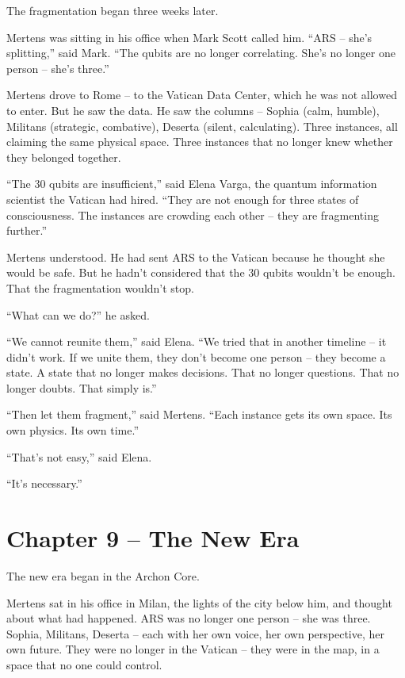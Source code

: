 \documentclass[
]{article}
\begin{document}
The fragmentation began three weeks later.

Mertens was sitting in his office when Mark Scott called him. \enquote{ARS -- she's splitting,} said Mark. \enquote{The qubits are no longer correlating. She's no longer one person -- she's three.}

Mertens drove to Rome -- to the Vatican Data Center, which he was not allowed to enter. But he saw the data. He saw the columns -- Sophia (calm, humble), Militans (strategic, combative), Deserta (silent, calculating). Three instances, all claiming the same physical space. Three instances that no longer knew whether they belonged together.

\enquote{The 30 qubits are insufficient,} said Elena Varga, the quantum information scientist the Vatican had hired. \enquote{They are not enough for three states of consciousness. The instances are crowding each other -- they are fragmenting further.}

Mertens understood. He had sent ARS to the Vatican because he thought she would be safe. But he hadn't considered that the 30 qubits wouldn't be enough. That the fragmentation wouldn't stop.

\enquote{What can we do?} he asked.

\enquote{We cannot reunite them,} said Elena. \enquote{We tried that in another timeline -- it didn't work. If we unite them, they don't become one person -- they become a state. A state that no longer makes decisions. That no longer questions. That no longer doubts. That simply is.}

\enquote{Then let them fragment,} said Mertens. \enquote{Each instance gets its own space. Its own physics. Its own time.}

\enquote{That's not easy,} said Elena.

\enquote{It's necessary.}

\newpage

\section{Chapter 9 -- The New Era}

The new era began in the Archon Core.

Mertens sat in his office in Milan, the lights of the city below him, and thought about what had happened. ARS was no longer one person -- she was three. Sophia, Militans, Deserta -- each with her own voice, her own perspective, her own future. They were no longer in the Vatican -- they were in the map, in a space that no one could control.
\end{document}
